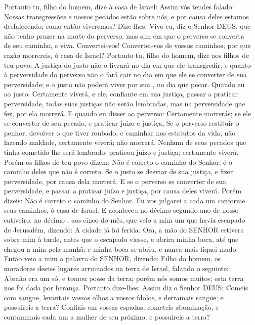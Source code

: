 {Portanto tu, filho do homem, dize à casa de Israel: Assim vós tendes falado: Nossas transgressões e nossos pecados estão sobre nós, e por causa deles estamos desfalecendo; como então viveremos?
Dize-lhes: Vivo eu, diz o Senhor DEUS, que não tenho prazer na morte do perverso, mas sim em que o perverso se converta de seu caminho, e viva. Convertei-vos! Convertei-vos de vossos caminhos; por que razão morrereis, ó casa de Israel?
Portanto tu, filho do homem, dize aos filhos de teu povo: A justiça do justo não o livrará no dia em que ele transgredir; e quanto à perversidade do perverso não o fará cair no dia em que ele se converter de sua perversidade; e o justo não poderá viver por sua
{} , no dia que pecar.
Quando eu ao justo: Certamente viverá, e ele, confiante em sua justiça, passar a praticar perversidade, todas suas justiças não serão lembradas, mas na perversidade que fez, por ela morrerá.
E quando eu disser ao perverso: Certamente morrerás; se ele se converter de seu pecado, e praticar juízo e justiça,
Se o perverso restituir o penhor, devolver o que tiver roubado, e caminhar nos estatutos da vida, não fazendo maldade, certamente viverá; não morrerá.
Nenhum de seus pecados que tinha cometido lhe será lembrado; praticou juízo e justiça; certamente viverá.
Porém os filhos de teu povo dizem: Não é correto o caminho do Senhor; é o caminho deles que não é correto.
Se o justo se desviar de sua justiça, e fizer perversidade, por causa dela morrerá.
E se o perverso se converter de sua perversidade, e passar a praticar juízo e justiça, por causa deles viverá.
Porém dizeis: Não é correto o caminho do Senhor. Eu vos julgarei a cada um conforme seus
{} caminhos, ó casa de Israel.
E aconteceu no décimo segundo ano de nosso cativeiro, no décimo
{} , aos cinco do mês, que veio a mim um que havia escapado de Jerusalém, dizendo: A cidade já foi ferida.
Ora, a mão do SENHOR estivera sobre mim à tarde, antes que o escapado viesse, e abrira minha boca, até que chegou a mim pela manhã; e minha boca se abriu, e nunca mais fiquei mudo.
Então veio a mim a palavra do SENHOR, dizendo:
Filho do homem, os moradores destes lugares arruinados na terra de Israel, falando o seguinte: Abraão era um só, e tomou posse da terra; porém nós somos muitos; esta terra nos foi dada por herança.
Portanto dize-lhes: Assim diz o Senhor DEUS: Comeis com sangue, levantais vossos olhos a vossos ídolos, e derramais sangue; e possuireis a terra?
Confiais em vossas espadas, cometeis abominação, e contaminais cada um a mulher de seu próximo; e possuireis a terra?
}
